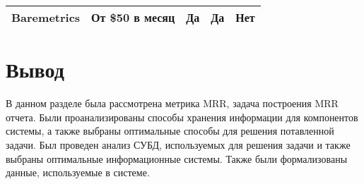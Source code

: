 \begin{table}[H]
{\begin{tabular}{|c|c|c|c|c|}
			Baremetrics                                                                & От \$50 в месяц                                                       & Да                                                                   & Да                                                                     & Нет                                                                        \\ \hline
		\end{tabular}%
	}
\end{table}

\section*{Вывод}

В данном разделе была рассмотрена метрика MRR, задача построения MRR отчета. Были проанализированы способы хранения информации для компонентов системы, а также выбраны оптимальные способы для решения потавленной задачи. Был проведен анализ СУБД, используемых для решения задачи и также выбраны оптимальные информационные системы. Также были формализованы данные, используемые в системе.